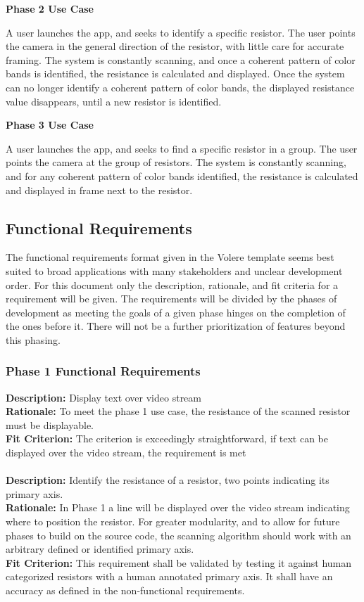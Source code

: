 \documentclass{article}
\begin{document}
\textbf{ Phase 2 Use Case}

A user launches the app, and seeks to identify a specific resistor.
The user points the camera in the general direction of the resistor, with little care for accurate framing.
The system is constantly scanning, and once a coherent pattern of color bands is identified, the resistance is calculated and displayed.
Once the system can no longer identify a coherent pattern of color bands, the displayed resistance value disappears, until a new resistor is identified.

\textbf{ Phase 3 Use Case}

A user launches the app, and seeks to find a specific resistor in a group.
The user points the camera at the group of resistors.
The system is constantly scanning, and for any coherent pattern of color bands identified, the resistance is calculated and displayed in frame next to the resistor.

\subsection{Functional Requirements}

The functional requirements format given in the Volere template seems best suited to broad applications with many stakeholders and unclear development order.
For this document only the description, rationale, and fit criteria for a requirement will be given.
The requirements will be divided by the phases of development as meeting the goals of a given phase hinges on the completion of the ones before it.
There will not be a further prioritization of features beyond this phasing.

\subsubsection{ Phase 1 Functional Requirements}

\textbf{Description:} Display text over video stream
\\ \textbf{Rationale:} To meet the phase 1 use case, the resistance of the scanned resistor must be displayable.
\\ \textbf{Fit Criterion:} The criterion is exceedingly straightforward, if text can be displayed over the video stream, the requirement is met
\\ \\
\textbf{Description: } Identify the resistance of a resistor, two points indicating its primary axis.
\\ \textbf{Rationale: } In Phase 1 a line will be displayed over the video stream indicating where to position the resistor.
For greater modularity, and to allow for future phases to build on the source code, the scanning algorithm should work with an arbitrary defined or identified primary axis.
\\ \textbf{Fit Criterion:} This requirement shall be validated by testing it against human categorized resistors with a human annotated primary axis.
It shall have an accuracy as defined in the non-functional requirements.
\end{document}
